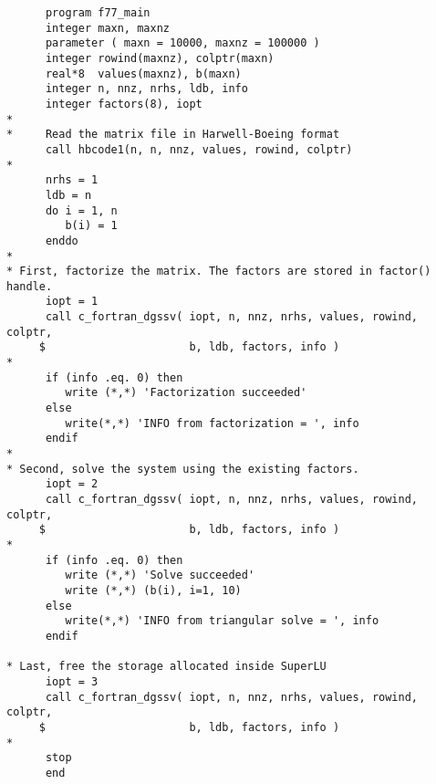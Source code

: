 \begin{verbatim}
      program f77_main
      integer maxn, maxnz
      parameter ( maxn = 10000, maxnz = 100000 )
      integer rowind(maxnz), colptr(maxn)
      real*8  values(maxnz), b(maxn)
      integer n, nnz, nrhs, ldb, info
      integer factors(8), iopt
*
*     Read the matrix file in Harwell-Boeing format
      call hbcode1(n, n, nnz, values, rowind, colptr)
*
      nrhs = 1
      ldb = n
      do i = 1, n
         b(i) = 1
      enddo
*
* First, factorize the matrix. The factors are stored in factor() handle.
      iopt = 1
      call c_fortran_dgssv( iopt, n, nnz, nrhs, values, rowind, colptr, 
     $                      b, ldb, factors, info )
*
      if (info .eq. 0) then
         write (*,*) 'Factorization succeeded'
      else
         write(*,*) 'INFO from factorization = ', info
      endif
*
* Second, solve the system using the existing factors.
      iopt = 2
      call c_fortran_dgssv( iopt, n, nnz, nrhs, values, rowind, colptr, 
     $                      b, ldb, factors, info )
*
      if (info .eq. 0) then
         write (*,*) 'Solve succeeded'
         write (*,*) (b(i), i=1, 10)
      else
         write(*,*) 'INFO from triangular solve = ', info
      endif

* Last, free the storage allocated inside SuperLU
      iopt = 3
      call c_fortran_dgssv( iopt, n, nnz, nrhs, values, rowind, colptr, 
     $                      b, ldb, factors, info )
*
      stop
      end
\end{verbatim}

